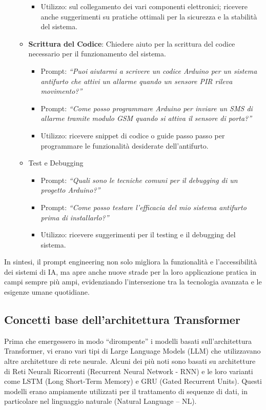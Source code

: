 \begin{itemize}
\begin{itemize}
\begin{itemize}
                        \item Utilizzo: sul collegamento dei vari componenti elettronici; ricevere anche suggerimenti su pratiche ottimali per la sicurezza e la stabilità del sistema.
                    \end{itemize}
                    \item \textbf{Scrittura del Codice}: Chiedere aiuto per la scrittura del codice necessario per il funzionamento del sistema.
                    \begin{itemize}
                        \item Prompt: \textit{``Puoi aiutarmi a scrivere un codice Arduino per un sistema antifurto che attivi un allarme quando un sensore PIR rileva movimento?''}
                        \item Prompt: \textit{``Come posso programmare Arduino per inviare un SMS di allarme tramite modulo GSM quando si attiva il sensore di porta?''}
                        \item Utilizzo: ricevere snippet di codice o guide passo passo per programmare le funzionalità desiderate dell’antifurto.
                    \end{itemize}
                    \item Test e Debugging
                    \begin{itemize}
                        \item Prompt: \textit{``Quali sono le tecniche comuni per il debugging di un progetto Arduino?''}
                        \item Prompt: \textit{``Come posso testare l'efficacia del mio sistema antifurto prima di installarlo?''}
                        \item Utilizzo: ricevere suggerimenti per il testing e il debugging del sistema.
                    \end{itemize}
                \end{itemize}
            \end{itemize}

            In sintesi, il prompt engineering non solo migliora la funzionalità e l'accessibilità dei sistemi di IA, ma apre anche nuove strade per la loro applicazione pratica in campi sempre più ampi, evidenziando l'intersezione tra la tecnologia avanzata e le esigenze umane quotidiane.  
            
    \subsection{Concetti base dell’architettura Transformer}
        Prima che emergessero in modo ``dirompente'' i modelli basati sull'architettura Transformer, vi erano vari tipi di Large Language Models (LLM) che utilizzavano altre architetture di rete neurale. Alcuni dei più noti sono basati su architetture di Reti Neurali Ricorrenti (Recurrent Neural Network - RNN) e le loro varianti come LSTM (Long Short-Term Memory) e GRU (Gated Recurrent Units). Questi modelli erano ampiamente utilizzati per il trattamento di sequenze di dati, in particolare nel linguaggio naturale (Natural Language – NL).  

